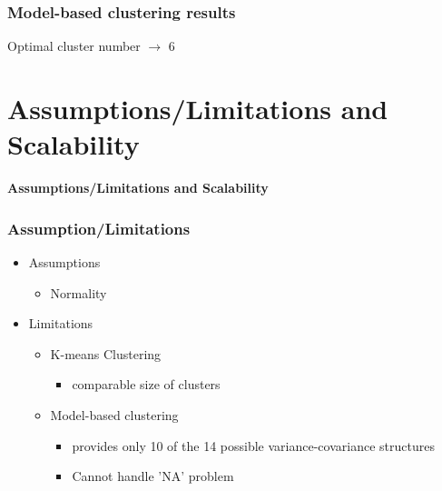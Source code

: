 \documentclass{beamer}
\begin{document}
\begin{frame}
\frametitle{Model-based clustering results}
Optimal cluster number $\rightarrow$ 6 \\
\begin{center}
\end{center}
\end{frame}





















\section{Assumptions/Limitations and Scalability}
\begin{frame}
\begin{center}
\textbf{Assumptions/Limitations and Scalability}
\end{center} 
\end{frame}


\begin{frame}
\frametitle{Assumption/Limitations}
\begin{itemize}
\item Assumptions
\begin{itemize}
\item Normality
\end{itemize}
\item Limitations
\begin{itemize}
\item K-means Clustering
\begin{itemize}
\item comparable size of clusters
\end{itemize}
\item Model-based clustering
\begin{itemize}
\item provides only 10 of the 14 possible variance-covariance structures
\item Cannot handle 'NA' problem
\end{itemize}

\end{itemize}


\end{itemize}
\end{frame}
\end{document}
